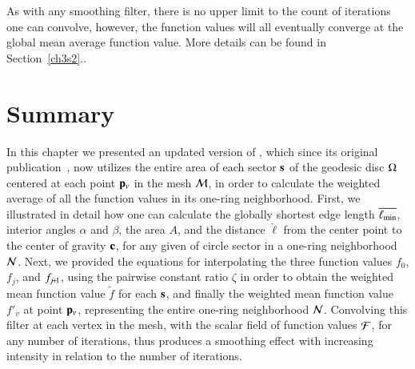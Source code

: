 As with any smoothing filter, there is no upper limit to the count of iterations one can convolve, however, the function values will all eventually converge at the global mean average function value. More details can be found in Section~\ref{ch3s2}..

%
%
%
\section{Summary}
\label{ch4sS}
In this chapter we presented an updated version of , which since its original publication~\cite[s.~3.2]{Mara17}, now utilizes the entire area of each sector $\mathbf{s}$ of the geodesic disc $\Omega$ centered at each point $\mathbf{p}_v$ in the mesh $\mathcal{M}$, in order to calculate the weighted average of all the function values in its one-ring neighborhood. First, we illustrated in detail how one can calculate the globally shortest edge length $\overline{\ell_\text{min}}$, interior angles $\alpha$ and $\beta$, the area $A$, and the distance $\check{\ell}$ from the center point to the center of gravity $\mathbf{c}$, for any given of circle sector in a one-ring neighborhood $\mathcal{N}$. Next, we provided the equations for interpolating the three function values $f_0$, $f_j$, and $f_{\sjpo}$, using the pairwise constant ratio $\zeta$ in order to obtain the weighted mean function value $\tilde{f}$ for each $\mathbf{s}$, and finally the weighted mean function value $f'_v$ at point $\mathbf{p}_v$, representing the entire one-ring neighborhood $\mathcal{N}$. Convolving this filter at each vertex in the mesh, with the scalar field of function values $\mathcal{F}$, for any number of iterations, thus produces a smoothing effect with increasing intensity in relation to the number of iterations.
